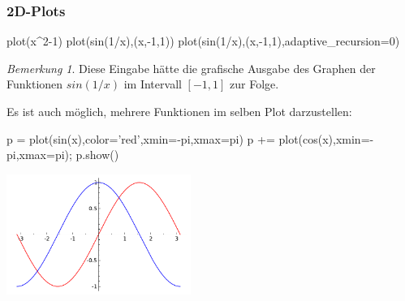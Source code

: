 \documentclass[fontsize=12pt,paper=a4,twoside,bibtotoc,idxtotoc,
liststotoc,pagesize,BCOR1.2cm,DIV15,chapterprefix,pagesize=pdftex]{scrbook}
\theoremstyle{plain}
\theoremstyle{definition}
\theoremstyle{remark}
\newtheorem{bem}[equation]{Bemerkung}
\begin{document}
\subsubsection{2D-Plots}

\begin{sagein}
plot(x^2-1)
plot(sin(1/x),(x,-1,1))
plot(sin(1/x),(x,-1,1),adaptive_recursion=0)
\end{sagein}

\begin{bem}
 Diese Eingabe hätte die grafische Ausgabe des Graphen der Funktionen $sin(1/x)$ im Intervall $[-1,1]$ zur Folge.
\end{bem}
Es ist auch möglich, mehrere Funktionen im selben Plot darzustellen:
\begin{sagein}
p = plot(sin(x),color='red',xmin=-pi,xmax=pi)
p += plot(cos(x),xmin=-pi,xmax=pi); p.show()
\end{sagein}
\begin{center}
\includegraphics[width=6cm]{sincos2.pdf} 
\end{center}
\end{document}
